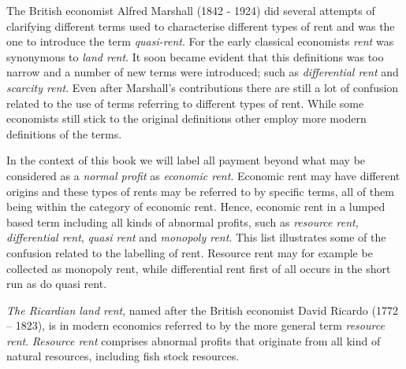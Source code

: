 \documentclass[11pt,fleqn]{book} %
\begin{document}
The British economist Alfred Marshall (1842 - 1924) did several attempts of clarifying different terms used to characterise different types of rent\cite{Marshall2009PrinciplesEconomics} and was the one to introduce the term \textit{quasi-rent}. For the early classical economists \textit{rent} was synonymous to \textit{land rent}. It soon became evident that this definitions was too narrow and a number of new terms were introduced; such as \textit{differential rent} and \textit{scarcity rent}. Even after Marshall's contributions there are still a lot of confusion related to the use of terms referring to different types of rent. While some economists still stick to the original definitions other employ more modern definitions of the terms.

In the context of this book we will label all payment beyond what may be considered as a \textit{normal profit} as \textit{economic rent}. Economic rent may have different origins and these types of rents may be referred to by specific terms, all of them being within the category of economic rent. Hence, economic rent in a lumped based term including all kinds of abnormal profits, such as \textit{resource rent}, \textit{differential rent}, \textit{quasi rent} and \textit{monopoly rent}. This list illustrates some of the confusion related to the labelling of rent. Resource rent may for example be collected as monopoly rent, while differential rent first of all occurs in the short run as do quasi rent.

\textit{The Ricardian land rent}, named after the British economist David Ricardo (1772 – 1823), is in modern economics referred to by the more general term \textit{resource rent}. \textit{Resource rent} comprises abnormal profits that originate from all kind of natural resources, including fish stock resources.

\end{document}
